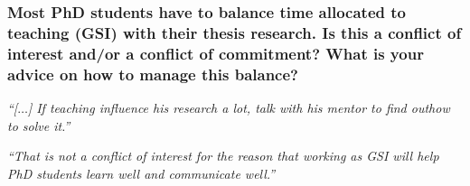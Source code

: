 \documentclass[12pt]{beamer}
\newcommand\ans[1]{{\it ``#1''}}
\newcommand\gap{\vspace{5mm}}
\begin{document}



\begin{frame} 
\frametitle{ 
Most PhD students have to balance time allocated to teaching (GSI) with their thesis research. Is this a conflict of interest and/or a conflict of commitment? What is your advice on how to manage this balance?
}


\ans{[$\dots$] If teaching influence his research a lot, talk with his mentor to find outhow to solve it.}


\gap

\ans{That  is  not  a  conflict  of  interest  for  the  reason  that  working  as  GSI  will  help  PhD students learn well and communicate well.}

\end{frame}
\end{document}
